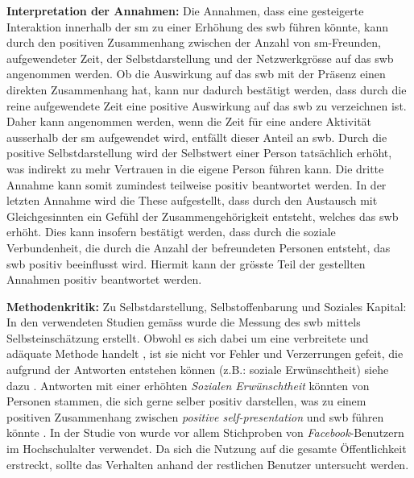 \textbf{Interpretation der Annahmen:}\newline
Die Annahmen, dass eine gesteigerte Interaktion innerhalb der \gls{sm} zu einer Erhöhung des \gls{swb} führen könnte, kann durch den positiven Zusammenhang zwischen der Anzahl von \gls{sm}-Freunden, aufgewendeter Zeit, der Selbstdarstellung und der Netzwerkgrösse auf das \gls{swb} angenommen werden.\newline
Ob die Auswirkung auf das \gls{swb} mit der Präsenz einen direkten Zusammenhang hat, kann nur dadurch bestätigt werden, dass durch die reine aufgewendete Zeit eine positive Auswirkung auf das \gls{swb} zu verzeichnen ist. Daher kann angenommen werden, wenn die Zeit für eine andere Aktivität ausserhalb der \gls{sm} aufgewendet wird, entfällt dieser Anteil an \gls{swb}.\newline
Durch die positive Selbstdarstellung wird der Selbstwert einer Person tatsächlich erhöht, was indirekt zu mehr Vertrauen in die eigene Person führen kann. Die dritte Annahme kann somit zumindest teilweise positiv beantwortet werden.\newline
In der letzten Annahme wird die These aufgestellt, dass durch den Austausch mit Gleichgesinnten ein Gefühl der Zusammengehörigkeit entsteht, welches das \gls{swb} erhöht. Dies kann insofern bestätigt werden, dass durch die soziale Verbundenheit, die durch die Anzahl der befreundeten Personen entsteht, das \gls{swb} positiv beeinflusst wird.\newline
Hiermit kann der grösste Teil der gestellten Annahmen positiv beantwortet werden.\par  
\textbf{Methodenkritik:}\newline
Zu Selbstdarstellung, Selbstoffenbarung und Soziales Kapital: \newline
In den verwendeten Studien gemäss  wurde die Messung des \gls{swb} mittels Selbsteinschätzung erstellt. Obwohl es sich dabei um eine verbreitete und adäquate Methode handelt \cite{Diener:2005}, ist sie nicht vor Fehler und Verzerrungen gefeit, die aufgrund der Antworten entstehen können (z.B.: soziale Erwünschtheit) siehe dazu . Antworten mit einer erhöhten \textit{Sozialen Erwünschtheit} könnten von Personen stammen, die sich gerne selber positiv darstellen, was zu einem positiven Zusammenhang zwischen \textit{positive self-presentation} und \gls{swb} führen könnte \cite{Diener:1991}.\newline
In der Studie von  wurde vor allem Stichproben von \textit{Facebook}-Benutzern im Hochschulalter verwendet. Da sich die Nutzung auf die gesamte Öffentlichkeit erstreckt, sollte das Verhalten anhand der restlichen Benutzer untersucht werden.\newline

